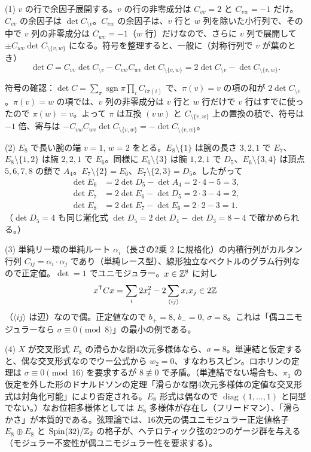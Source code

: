 \begin{solution}
(1) $v$ の行で余因子展開する。$v$ の行の非零成分は $C_{vv}=2$ と $C_{vw}=-1$ だけ。$C_{vv}$ の余因子は $\det C_{\setminus v}$。$C_{vw}$ の余因子は、$v$ 行と $w$ 列を除いた小行列で、その中で $v$ 列の非零成分は $C_{wv}=-1$（$w$ 行）だけなので、さらに $v$ 列で展開して $\pm C_{wv}\det C_{\setminus\{v,w\}}$ になる。符号を整理すると、一般に（対称行列で $v$ が葉のとき）
\[
\det C=C_{vv}\det C_{\setminus v}-C_{vw}C_{wv}\det C_{\setminus\{v,w\}}=2\det C_{\setminus v}-\det C_{\setminus\{v,w\}} .
\]
\begin{note}
符号の確認：$\det C=\sum_\pi\operatorname{sgn}\pi\prod_iC_{i\pi(i)}$ で、$\pi(v)=v$ の項の和が $2\det C_{\setminus v}$。$\pi(v)=w$ の項では、$v$ 列の非零成分は $v$ 行と $w$ 行だけで $v$ 行はすでに使ったので $\pi(w)=v$。よって $\pi$ は互換 $(v\,w)$ と $C_{\setminus\{v,w\}}$ 上の置換の積で、符号は $-1$ 倍、寄与は $-C_{vw}C_{wv}\det C_{\setminus\{v,w\}}=-\det C_{\setminus\{v,w\}}$。
\end{note}

(2) $E_8$ で長い腕の端 $v=1$, $w=2$ をとる。$E_8\setminus\{1\}$ は腕の長さ $3,2,1$ で $E_7$、$E_8\setminus\{1,2\}$ は腕 $2,2,1$ で $E_6$。同様に $E_6\setminus\{3\}$ は腕 $1,2,1$ で $D_5$、$E_6\setminus\{3,4\}$ は頂点 $5,6,7,8$ の鎖で $A_4$。$E_7\setminus\{2\}=E_6$、$E_7\setminus\{2,3\}=D_5$。したがって
\begin{align*}
\det E_6&=2\det D_5-\det A_4=2\cdot4-5=3,\\
\det E_7&=2\det E_6-\det D_5=2\cdot3-4=2,\\
\det E_8&=2\det E_7-\det E_6=2\cdot2-3=1 .
\end{align*}
（$\det D_5=4$ も同じ漸化式 $\det D_5=2\det D_4-\det D_3=8-4$ で確かめられる。）

(3) 単純リー環の単純ルート $\alpha_i$（長さの2乗 $2$ に規格化）の内積行列がカルタン行列 $C_{ij}=\alpha_i\cdot\alpha_j$ であり（単純レース型）、線形独立なベクトルのグラム行列なので正定値。$\det=1$ でユニモジュラー。$x\in\mathbb{Z}^8$ に対し
\[
x^{\mathsf T}Cx=\sum_i2x_i^2-2\sum_{\langle ij\rangle}x_ix_j\in2\mathbb{Z}
\]
（$\langle ij\rangle$ は辺）なので偶。正定値なので $b_+=8$, $b_-=0$, $\sigma=8$。これは「偶ユニモジュラーなら $\sigma\equiv0\pmod8$」の最小の例である。

(4) $X$ が交叉形式 $E_8$ の滑らかな閉4次元多様体なら、$\sigma=8$。単連結と仮定すると、偶な交叉形式なのでウー公式から $w_2=0$、すなわちスピン。ロホリンの定理は $\sigma\equiv0\pmod{16}$ を要求するが $8\not\equiv0$ で矛盾。（単連結でない場合も、$\pi_1$ の仮定を外した形のドナルドソンの定理「滑らかな閉4次元多様体の定値な交叉形式は対角化可能」により否定される。$E_8$ 形式は偶なので $\operatorname{diag}(1,\dots,1)$ と同型でない。）なお位相多様体としては $E_8$ 多様体が存在し（フリードマン）、「滑らかさ」が本質的である。弦理論では、16次元の偶ユニモジュラー正定値格子 $E_8\oplus E_8$ と $\mathrm{Spin}(32)/\mathbb{Z}_2$ の格子が、ヘテロティック弦の2つのゲージ群を与える（モジュラー不変性が偶ユニモジュラー性を要求する）。
\end{solution}

